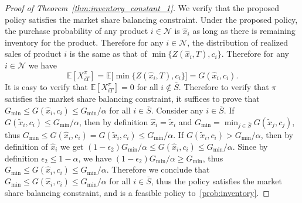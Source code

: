 \documentclass[mnsc,non-blindrev]{informs3}
\theoremstyle{definition}
\begin{document}
\begin{proof}[Proof of Theorem~\ref{thm:inventory_constant_1}]
We verify that the proposed policy satisfies the market share balancing constraint. Under the proposed policy, the purchase probability of any product $i\in\mathcal{N}$ is $\hat{x}_i$ as long as there is remaining inventory for the product. Therefore for any $i\in\mathcal{N}$, the distribution of realized sales of product $i$ is the same as that of $\min\{Z(\hat{x}_i,T),c_i\}$. Therefore for any $i\in\mathcal{N}$ we have
\begin{equation*}
\mathbb{E}[X_{iT}^\pi]=\mathbb{E}\Big[\min\Big\{Z(\hat{x}_i,T),c_i\Big\}\Big]=G(\hat{x}_i,c_i).
\end{equation*}
It is easy to verify that $\mathbb{E}[X_{iT}^\pi]=0$ for all $i\notin \bar{S}$. Therefore to verify that $\pi$ satisfies the market share balancing constraint, it suffices to prove that $G_{\min}\leq G(\hat{x}_i,c_i)\leq G_{\min}/\alpha$ for all $i\in\bar{S}$. Consider any $i\in\bar{S}$. If $G(\tilde{x}_i,c_i)\leq G_{\min}/\alpha$, then by definition $\hat{x}_i=\tilde{x}_i$ and $G_{\min}=\min_{j\in\bar{S}}G(\tilde{x}_j,c_j)$, thus \mbox{$G_{\min}\leq G(\hat{x}_i,c_i)=G(\tilde{x}_i,c_i)\leq G_{\min}/\alpha$.} If $G(\tilde{x}_i,c_i)>G_{\min}/\alpha$, then by definition of $\hat{x}_i$ we get \mbox{$(1-\epsilon_2)G_{\min}/\alpha\leq G(\hat{x}_i,c_i)\leq G_{\min}/\alpha$.} Since by definition $\epsilon_2\leq 1-\alpha$, we have $(1-\epsilon_2)G_{\min}/\alpha\geq G_{\min}$, thus $G_{\min}\leq G(\hat{x}_i,c_i)\leq G_{\min}/\alpha$. Therefore we conclude that $G_{\min}\leq G(\hat{x}_i,c_i)\leq G_{\min}/\alpha$ for all $i\in\bar{S}$, thus the policy satisfies the market share balancing constraint, and is a feasible policy to~\ref{prob:inventory}.


\end{proof}
\end{document}
